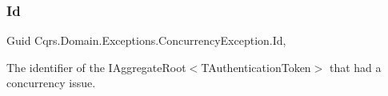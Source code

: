 \subsubsection{\texorpdfstring{Id}{Id}}
{\footnotesize\ttfamily Guid Cqrs.\+Domain.\+Exceptions.\+Concurrency\+Exception.\+Id\hspace{0.3cm}{\ttfamily [get]}, {\ttfamily [set]}}



The identifier of the I\+Aggregate\+Root$<$\+T\+Authentication\+Token$>$ that had a concurrency issue. 

